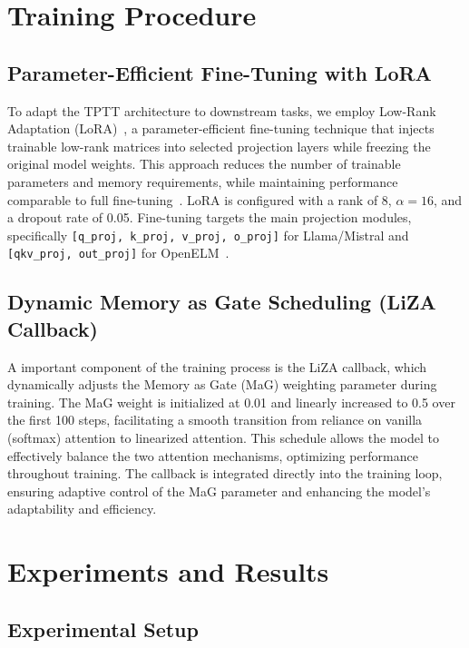 \documentclass[10pt,a4paper]{article}
\begin{document}
\section{Training Procedure}

\subsection{Parameter-Efficient Fine-Tuning with LoRA}

To adapt the TPTT architecture to downstream tasks, we employ Low-Rank Adaptation (LoRA)~\cite{hu2022lora, lora_hf}, a parameter-efficient fine-tuning technique that injects trainable low-rank matrices into selected projection layers while freezing the original model weights. This approach reduces the number of trainable parameters and memory requirements, while maintaining performance comparable to full fine-tuning~\cite{hu2022lora, lora_hf}. LoRA is configured with a rank of 8, $\alpha=16$, and a dropout rate of 0.05. Fine-tuning targets the main projection modules, specifically \texttt{[q\_proj, k\_proj, v\_proj, o\_proj]} for Llama/Mistral and \texttt{[qkv\_proj, out\_proj]} for OpenELM~\cite{lora_hf}.

\subsection{Dynamic Memory as Gate Scheduling (LiZA Callback)}

A important component of the training process is the LiZA callback, which dynamically adjusts the Memory as Gate (MaG) weighting parameter during training. The MaG weight is initialized at 0.01 and linearly increased to 0.5 over the first 100 steps, facilitating a smooth transition from reliance on vanilla (softmax) attention to linearized attention. This schedule allows the model to effectively balance the two attention mechanisms, optimizing performance throughout training. The callback is integrated directly into the training loop, ensuring adaptive control of the MaG parameter and enhancing the model's adaptability and efficiency.


\section{Experiments and Results}

\subsection{Experimental Setup}
\end{document}
